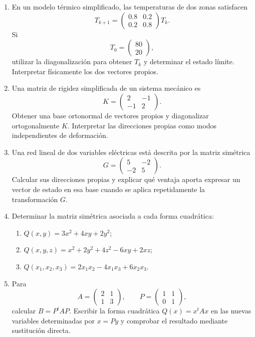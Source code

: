 \begin{enumerate}
\item En un modelo térmico simplificado, las temperaturas de dos zonas satisfacen
\[
T_{k+1}=
\begin{pmatrix}
0.8&0.2\\
0.2&0.8
\end{pmatrix}T_k.
\]
Si
\[
T_0=\begin{pmatrix}80\\20\end{pmatrix},
\]
utilizar la diagonalización para obtener $T_k$ y determinar el estado límite. Interpretar físicamente los dos vectores propios.

\item Una matriz de rigidez simplificada de un sistema mecánico es
\[
K=\begin{pmatrix}
2&-1\\
-1&2
\end{pmatrix}.
\]
Obtener una base ortonormal de vectores propios y diagonalizar ortogonalmente $K$. Interpretar las direcciones propias como modos independientes de deformación.

\item Una red lineal de dos variables eléctricas está descrita por la matriz simétrica
\[
G=\begin{pmatrix}
5&-2\\
-2&5
\end{pmatrix}.
\]
Calcular sus direcciones propias y explicar qué ventaja aporta expresar un vector de estado en esa base cuando se aplica repetidamente la transformación $G$.

\item Determinar la matriz simétrica asociada a cada forma cuadrática:
\begin{enumerate}[label=\alph*)]
\item $Q(x,y)=3x^2+4xy+2y^2$;
\item $Q(x,y,z)=x^2+2y^2+4z^2-6xy+2xz$;
\item $Q(x_1,x_2,x_3)=2x_1x_2-4x_1x_3+6x_2x_3$.
\end{enumerate}

\item Para
\[
A=\begin{pmatrix}
2&1\\
1&3
\end{pmatrix},
\qquad
P=\begin{pmatrix}
1&1\\
0&1
\end{pmatrix},
\]
calcular $B=P^tAP$. Escribir la forma cuadrática $Q(x)=x^tAx$ en las nuevas variables determinadas por $x=Py$ y comprobar el resultado mediante sustitución directa.


\end{enumerate}
